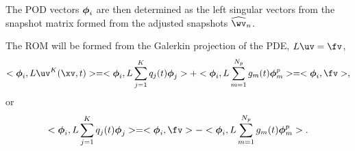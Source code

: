 The POD vectors $\boldsymbol{\phi}_i$ are then determined as the left singular vectors from the snapshot matrix formed from 
the adjusted snapshots $\widehat{\wv}_n$.

The ROM will be formed from the Galerkin projection of the PDE, $L\uv=\fv$, 
\begin{align}
  <\phiv_i, L\uv^K(\xv,t)>  = <\phiv_i, L \sum_{j=1}^K q_j(t) \phiv_j>  +  <\phiv_i,L \sum_{m=1}^{N_p} g_m(t) \phiv_m^p > = <\phiv_i,\fv >, 
\end{align}
or 
\begin{align}
  <\phiv_i, L \sum_{j=1}^K q_j(t) \phiv_j>  = <\phiv_i,\fv > - <\phiv_i, L \sum_{m=1}^{N_p} g_m(t) \phiv_m^p >.
\end{align}

